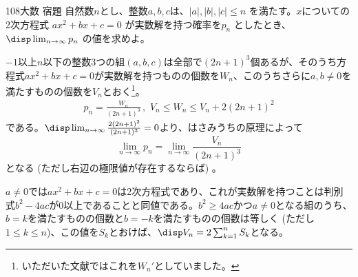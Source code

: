 \begin{prob}{108}{}{大数 宿題}
 自然数$n$とし、整数$a, b, c$は、$|a|, |b|, |c| \le n$ を満たす。$x$についての2次方程式 $ax^2+bx+c=0$ が実数解を持つ確率を$p_n$ としたとき、$\disp \lim_{n\to\infty} p_n$ の値を求めよ。
\end{prob}
$-1$以上$n$以下の整数3つの組$(a, b, c)$は全部で$(2n+1)^3$個あるが、そのうち方程式$ax^2+bx+c=0$が実数解を持つものの個数を$W_n$、このうちさらに$a, b\neq 0$を満たすものの個数を$V_n$とおく\footnote{いただいた文献ではこれを$W_n'$としていました。}。
\begin{align*}
 p_n=\frac{W_n}{(2n+1)^3} \,,\,\, V_n\le W_n \le V_n+2(2n+1)^2
\end{align*}
である。$\disp \lim_{n\to\infty} \frac{2(2n+1)^2}{(2n+1)^3}=0$より、はさみうちの原理によって
\[ \lim_{n\to\infty} p_n=\lim_{n\to\infty} \frac{V_n}{(2n+1)^3} \]
となる (ただし右辺の極限値が存在するならば) 。

$a\neq 0$では$ax^2+bx+c=0$は2次方程式であり、これが実数解を持つことは判別式$b^2-4ac$が0以上であることと同値である。$b^2\ge 4ac$かつ$a\neq 0$となる組のうち、$b=k$を満たすものの個数と$b=-k$を満たすものの個数は等しく (ただし$1\le k\le n$)、この値を$S_k$とおけば、$\disp V_n=2\sum_{k=1}^n S_k$となる。


